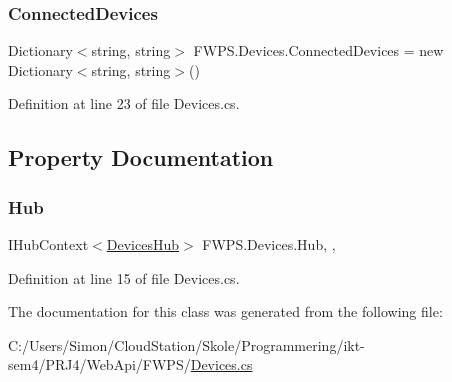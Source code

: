 \subsubsection{\texorpdfstring{Connected\+Devices}{ConnectedDevices}}
{\footnotesize\ttfamily Dictionary$<$string, string$>$ F\+W\+P\+S.\+Devices.\+Connected\+Devices = new Dictionary$<$string, string$>$()\hspace{0.3cm}{\ttfamily [static]}}



Definition at line 23 of file Devices.\+cs.



\subsection{Property Documentation}
\mbox{\label{class_f_w_p_s_1_1_devices_a417be10bd7ef62349833bb0d6d32c235}} 
\subsubsection{\texorpdfstring{Hub}{Hub}}
{\footnotesize\ttfamily I\+Hub\+Context$<$\mbox{\hyperlink{class_f_w_p_s_1_1_devices_hub}{Devices\+Hub}}$>$ F\+W\+P\+S.\+Devices.\+Hub\hspace{0.3cm}{\ttfamily [static]}, {\ttfamily [get]}, {\ttfamily [set]}}



Definition at line 15 of file Devices.\+cs.



The documentation for this class was generated from the following file\+:\begin{DoxyCompactItemize}
\item 
C\+:/\+Users/\+Simon/\+Cloud\+Station/\+Skole/\+Programmering/ikt-\/sem4/\+P\+R\+J4/\+Web\+Api/\+F\+W\+P\+S/\mbox{\hyperlink{_devices_8cs}{Devices.\+cs}}\end{DoxyCompactItemize}
